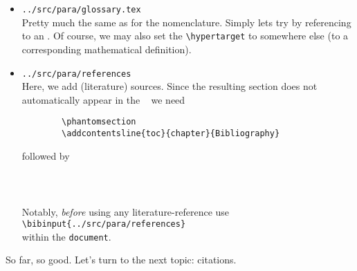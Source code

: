\begin{itemize}
	\item \texttt{../src/para/glossary.tex} \\ 
	Pretty much the same as for the nomenclature. Simply lets try by referencing to an \RKHS. Of course, we may also set the \verb|\hypertarget| to somewhere else (\eg to a corresponding mathematical definition).
	
	\item \texttt{../src/para/references} \\ 
	Here, we add (literature) sources. Since the resulting section does not automatically appear in the \mytoc~ we need
	\begin{verbatim}
		\phantomsection
		\addcontentsline{toc}{chapter}{Bibliography}
	\end{verbatim}
	followed by
	\begin{verbatim}
		
		
	\end{verbatim}
	Notably, \emph{before} using any literature-reference use\\
	\verb|\bibinput{../src/para/references}|\\
	within the \verb|document|.
	
\end{itemize}

So far, so good. Let’s turn to the next topic: citations. 